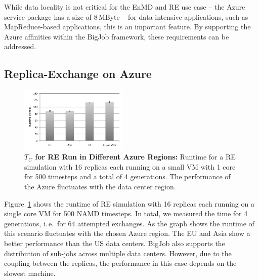 \documentclass[conference,final]{IEEEtran}
\newcommand{\up}{\vspace*{-1em}}
\newcommand{\tc}{$T_{C}$ }
\begin{document}
While data locality is not critical for the EnMD and RE use case --
the Azure service package has a size of 8\,MByte -- for data-intensive
applications, such as MapReduce-based applications, this is an
important feature. By supporting the Azure affinities within the
BigJob framework, these requirements can be addressed.

\subsection{Replica-Exchange on Azure}
\up
\begin{figure}[htbp]
    \centering
        \includegraphics[width=0.46\textwidth]{performance/repex_runtime_per_region.pdf}
    \caption{\textbf{\tc for RE Run in Different Azure Regions:} Runtime for a RE simulation with 
    16 replicas each running on a small VM with 1 core for 500 timesteps and a total of 4 generations. The performance of
    the Azure fluctuates with the data center region. }
    \label{fig:performance_repex_runtime_per_region}
\end{figure}

Figure~\ref{fig:performance_repex_runtime_per_region} shows the
runtime of RE simulation with 16 replicas each running on a single
core VM for 500 NAMD timesteps. In total, we measured the time for 4
generations, i.\,e.\ for 64 attempted exchanges. As the graph shows
the runtime of this scenario fluctuates with the chosen Azure
region. The EU and Asia show a better performance than the US data
centers. BigJob also supports the distribution of sub-jobs across
multiple data centers. However, due to the coupling between the
replicas, the performance in this case depends on the slowest machine.
\end{document}
